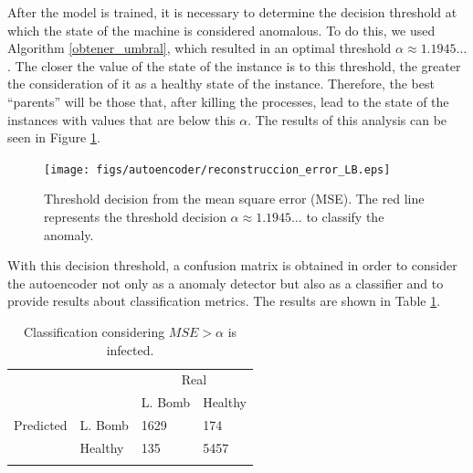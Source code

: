 \documentclass{iosart2c}
\begin{document}
After the model is trained, it is necessary to determine the decision threshold at which the state of the machine is considered anomalous. To do this, we used Algorithm \ref{obtener_umbral}, which resulted in an optimal threshold $\alpha\approx 1.1945\ldots$. The closer the value of the state of the instance is to this threshold, the greater the consideration of it as a healthy state of the instance. Therefore, the best ``parents'' will be those that, after killing the processes, lead to the state of the instances with values that are below this $\alpha$. The results of this analysis can be seen in Figure \ref{fig:reconstuction_LB}.


\begin{figure}[h!]
\centering
\texttt{[image: figs/autoencoder/reconstruccion\_error\_LB.eps]}
\caption{Threshold decision from the mean square error (MSE). The red line represents the threshold decision $\alpha\approx1.1945\ldots$ to classify the anomaly.}
\label{fig:reconstuction_LB}
\end{figure}

With this decision threshold, a confusion matrix is obtained in order to consider the autoencoder not only as a anomaly detector but also as a classifier and to provide results about classification metrics. The results are shown in Table \ref{confusion_matrix}.


\begin{table}[h!]
\centering
\begin{tabular}{llll}
                                                &                                 & \multicolumn{2}{c}{Real}                                       \\ \cline{3-4} 
                                                & \multicolumn{1}{l|}{}           & \multicolumn{1}{l|}{L. Bomb} & \multicolumn{1}{l|}{Healthy} \\ \cline{2-4} 
\multicolumn{1}{c|}{Predicted} & \multicolumn{1}{l|}{L. Bomb} & \multicolumn{1}{l|}{1629}       & \multicolumn{1}{l|}{174}     \\ \cline{2-4} 
\multicolumn{1}{c|}{}                           & \multicolumn{1}{l|}{Healthy}    & \multicolumn{1}{l|}{135}        & \multicolumn{1}{l|}{5457}    \\ \cline{2-4} 
\vspace{0.001cm}
\end{tabular}
\caption{Classification considering  $MSE>\alpha$ is infected.}
\label{confusion_matrix}
\end{table}
\end{document}
